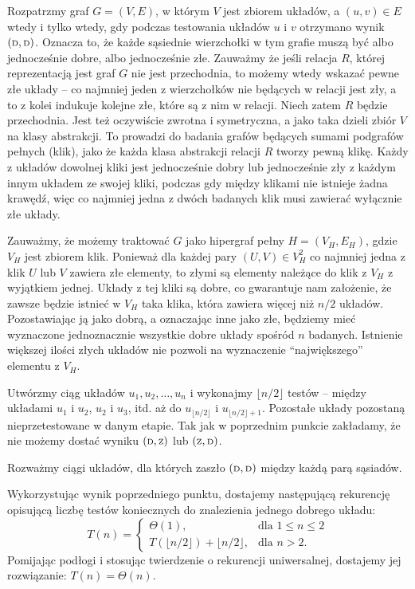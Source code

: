 Rozpatrzmy graf $G=(V,E)$, w którym $V$ jest zbiorem układów, a $(u,v)\in E$ wtedy i tylko wtedy, gdy podczas testowania układów $u$ i $v$ otrzymano wynik $({\scriptstyle\rm D},{\scriptstyle\rm D})$. Oznacza to, że każde sąsiednie wierzchołki w tym grafie muszą być albo jednocześnie dobre, albo jednocześnie złe. Zauważmy że jeśli relacja $R$, której reprezentacją jest graf $G$ nie jest przechodnia, to możemy wtedy wskazać pewne złe układy -- co najmniej jeden z wierzchołków nie będących w relacji jest zły, a to z kolei indukuje kolejne złe, które są z nim w relacji. Niech zatem $R$ będzie przechodnia. Jest też oczywiście zwrotna i symetryczna, a jako taka dzieli zbiór $V$ na klasy abstrakcji. To prowadzi do badania grafów będących sumami podgrafów pełnych (klik), jako że każda klasa abstrakcji relacji $R$ tworzy pewną klikę. Każdy z układów dowolnej kliki jest jednocześnie dobry lub jednocześnie zły z każdym innym układem ze swojej kliki, podczas gdy między klikami nie istnieje żadna krawędź, więc co najmniej jedna z dwóch badanych klik musi zawierać wyłącznie złe układy.

Zauważmy, że możemy traktować $G$ jako hipergraf pełny $H=(V_H,E_H)$, gdzie $V_H$ jest zbiorem klik. Ponieważ dla każdej pary $(U,V)\in V_H^2$ co najmniej jedna z klik $U$ lub $V$ zawiera złe elementy, to złymi są elementy należące do klik z $V_H$ z wyjątkiem jednej. Układy z tej kliki są dobre, co gwarantuje nam założenie, że zawsze będzie istnieć w $V_H$ taka klika, która zawiera więcej niż $n/2$ układów. Pozostawiając ją jako dobrą, a oznaczając inne jako złe, będziemy mieć wyznaczone jednoznacznie wszystkie dobre układy spośród $n$ badanych. Istnienie większej ilości złych układów nie pozwoli na wyznaczenie ``największego'' elementu z $V_H$.

\subexercise{} %
Utwórzmy ciąg układów $u_1,u_2,\dots,u_n$ i wykonajmy $\lfloor n/2\rfloor$ testów -- między układami $u_1$ i $u_2$, $u_2$ i $u_3$, itd. aż do $u_{\lfloor n/2\rfloor}$ i $u_{\lfloor n/2\rfloor+1}$. Pozostałe układy pozostaną nieprzetestowane w danym etapie. Tak jak w poprzednim punkcie zakładamy, że nie możemy dostać wyniku $({\scriptstyle\rm D},{\scriptstyle\rm Z})$ lub $({\scriptstyle\rm Z},{\scriptstyle\rm D})$.

Rozważmy ciągi układów, dla których zaszło $({\scriptstyle\rm D},{\scriptstyle\rm D})$ między każdą parą sąsiadów. 

\subexercise{} %
Wykorzystując wynik poprzedniego punktu, dostajemy następującą rekurencję opisującą liczbę testów koniecznych do znalezienia jednego dobrego układu:
\[
	T(n) =
	\begin{cases}
		\Theta(1), & \text{dla $1\le n\le2$} \\
		T(\lfloor n/2\rfloor) + \lfloor n/2\rfloor, & \text{dla $n>2$}.
	\end{cases}
\]
Pomijając podłogi i stosując twierdzenie o rekurencji uniwersalnej, dostajemy jej rozwiązanie: $T(n)=\Theta(n)$.

